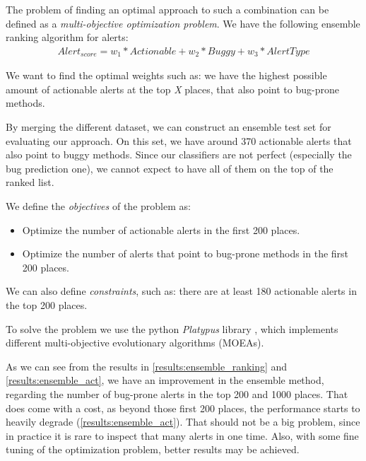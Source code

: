 The problem of finding an optimal approach to such a combination can be defined as a \textit{multi-objective optimization problem}. We have the following ensemble ranking algorithm for alerts:
\begin{gather*}
Alert_{score} = w_{1} * Actionable + w_{2} * Buggy + w_{3} * AlertType
\end{gather*}

We want to find the optimal weights such as: we have the highest possible amount of actionable alerts at the top \textit{X} places, that also point to bug-prone methods.

By merging the different dataset, we can construct an ensemble test set for evaluating our approach. On this set, we have around 370 actionable alerts that also point to buggy methods. Since our classifiers are not perfect (especially the bug prediction one), we cannot expect to have all of them on the top of the ranked list.

We define the \textit{objectives} of the problem as:
\begin{itemize}
	\item Optimize the number of actionable alerts in the first 200 places.
	\item Optimize the number of alerts that point to bug-prone methods in the first 200 places.
\end{itemize}

We can also define \textit{constraints}, such as: there are at least 180 actionable alerts in the top 200 places.

To solve the problem we use the python \textit{Platypus} library \cite{platypus}, which implements different multi-objective evolutionary algorithms (MOEAs). 

As we can see from the results in \cref{results:ensemble_ranking} and \cref{results:ensemble_act}, we have an improvement in the ensemble method, regarding the number of bug-prone alerts in the top 200 and 1000 places. That does come with a cost, as beyond those first 200 places, the performance starts to heavily degrade (\cref{results:ensemble_act}). That should not be a big problem, since in practice it is rare to inspect that many alerts in one time. Also, with some fine tuning of the optimization problem, better results may be achieved. 


